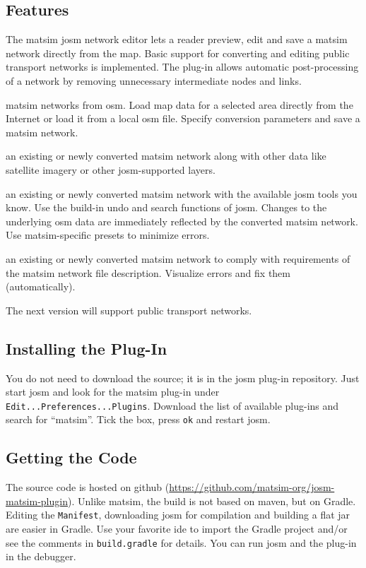 \subsection{Features}
The \gls{matsim} \gls{josm} network editor lets a reader preview, edit and save a \gls{matsim} network directly from the map. Basic support for converting and editing public transport networks is implemented. The plug-in allows automatic post-processing of a network by removing unnecessary intermediate nodes and links.
\begin{description}\styleDescription
\item[Convert] \gls{matsim} networks from \gls{osm}. Load map data for a selected area directly from the Internet or load it from a local \gls{osm} file. Specify conversion parameters and save a \gls{matsim} network.
\item[Visualize] an existing or newly converted \gls{matsim} network along with other data like satellite imagery or other \gls{josm}-supported layers.
\item[Edit] an existing or newly converted \gls{matsim} network with the available \gls{josm} tools you know. Use the build-in undo and search functions of \gls{josm}. Changes to the underlying \gls{osm} data are immediately reflected by the converted \gls{matsim} network. Use \gls{matsim}-specific presets to minimize errors.
\item[Validate] an existing or newly converted \gls{matsim} network to comply with requirements of the \gls{matsim} network file description. Visualize errors and fix them (automatically). 
\end{description}
The next version will support public transport networks.

\subsection{Installing the Plug-In}
You do not need to download the source; it is in the \gls{josm} plug-in repository. Just start \gls{josm} and look for the \gls{matsim} plug-in under \lstinline|Edit...Preferences...Plugins|. Download the list of available plug-ins and search for ``matsim''. Tick the box, press \lstinline|ok| and restart \gls{josm}.

\subsection{Getting the Code}
The source code is hosted on github (\url{https://github.com/matsim-org/josm-matsim-plugin}). Unlike \gls{matsim}, the build is not based on \gls{maven}, but on Gradle. Editing the \lstinline|Manifest|, downloading \gls{josm} for compilation and building a flat \gls{jar} are easier in Gradle. Use your favorite \gls{ide} to import the Gradle project and/or see the comments in \lstinline|build.gradle| for details. You can run \gls{josm} and the plug-in in the debugger.
 
